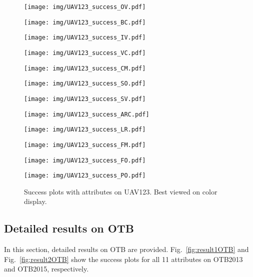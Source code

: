 \documentclass[runningheads]{llncs}
\begin{document}
\begin{figure*}[htbp]
 \centering
\begin{minipage}[c]{3cm}
\texttt{[image: img/UAV123\_success\_OV.pdf]}
\end{minipage}\begin{minipage}[c]{3cm}
\texttt{[image: img/UAV123\_success\_BC.pdf]}
\end{minipage}\begin{minipage}[c]{3cm}
\texttt{[image: img/UAV123\_success\_IV.pdf]}
\end{minipage}\begin{minipage}[c]{3cm}
\texttt{[image: img/UAV123\_success\_VC.pdf]}
\end{minipage}

\begin{minipage}[c]{3cm}
\texttt{[image: img/UAV123\_success\_CM.pdf]}
\end{minipage}\begin{minipage}[c]{3cm}
\texttt{[image: img/UAV123\_success\_SO.pdf]}
\end{minipage}\begin{minipage}[c]{3cm}
\texttt{[image: img/UAV123\_success\_SV.pdf]}
\end{minipage}\begin{minipage}[c]{3cm}
\texttt{[image: img/UAV123\_success\_ARC.pdf]}
\end{minipage}

\begin{minipage}[c]{3cm}
\texttt{[image: img/UAV123\_success\_LR.pdf]}
\end{minipage}\begin{minipage}[c]{3cm}
\texttt{[image: img/UAV123\_success\_FM.pdf]}
\end{minipage}\begin{minipage}[c]{3cm}
\texttt{[image: img/UAV123\_success\_FO.pdf]}
\end{minipage}\begin{minipage}[c]{3cm}
\texttt{[image: img/UAV123\_success\_PO.pdf]}
\end{minipage}\caption{Success plots with attributes on UAV123. Best viewed on color display.}
\label{UAV123_attributes}
\end{figure*}



\subsection{Detailed results on OTB}
In this section, detailed results on OTB are provided. Fig.~\ref{fig:result1OTB} and Fig.~\ref{fig:result2OTB} show the success plots for all 11 attributes on OTB2013 and OTB2015, respectively.
\end{document}
